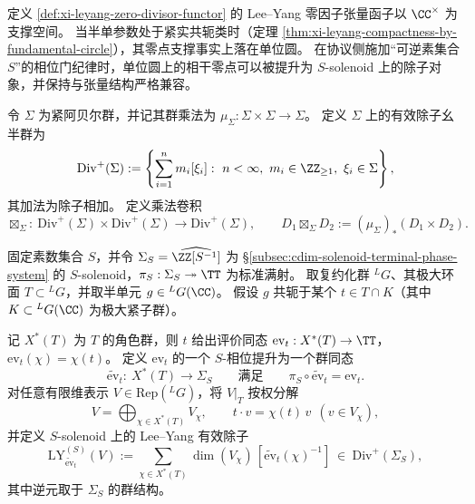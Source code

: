 \noindent
定义 \ref{def:xi-leyang-zero-divisor-functor} 的 Lee--Yang 零因子张量函子以 \(\CC^{\times}\) 为支撑空间。
当半单参数处于紧实共轭类时（定理 \ref{thm:xi-leyang-compactness-by-fundamental-circle}），其零点支撑事实上落在单位圆。
在协议侧施加“可逆素集合 \(S\)”的相位门纪律时，单位圆上的相干零点可以被提升为 \(S\)-solenoid 上的除子对象，并保持与张量结构严格兼容。
\par

\begin{definition}[紧交换群上的有效除子与乘法推前卷积]\label{def:xi-solenoid-divisor-convolution}
令 \(\Sigma\) 为紧阿贝尔群，并记其群乘法为
\(
\mu_{\Sigma}:\Sigma\times\Sigma\to \Sigma
\)。
定义 \(\Sigma\) 上的有效除子幺半群为
\[
\mathrm{Div}^{+}(\Sigma)
:=\left\{\sum_{i=1}^{n}m_i[\xi_i]:\ n<\infty,\ m_i\in\ZZ_{\ge 1},\ \xi_i\in\Sigma\right\},
\]
其加法为除子相加。
定义乘法卷积
\[
\boxtimes_{\Sigma}:\ \mathrm{Div}^{+}(\Sigma)\times \mathrm{Div}^{+}(\Sigma)\to \mathrm{Div}^{+}(\Sigma),
\qquad
D_1\boxtimes_{\Sigma} D_2
:=(\mu_{\Sigma})_{\ast}(D_1\times D_2).
\]
\end{definition}

\begin{definition}\label{def:xi-leyang-solenoidal-divisor}
固定素数集合 \(S\)，并令 \(\Sigma_S=\widehat{\ZZ[S^{-1}]}\) 为 \S\ref{subsec:cdim-solenoid-terminal-phase-system} 的 \(S\)-solenoid，\(\pi_S:\Sigma_S\twoheadrightarrow \TT\) 为标准满射。
取复约化群 \({}^{L}G\)、其极大环面 \(T\subset {}^{L}G\)，并取半单元 \(g\in {}^{L}G(\CC)\)。
假设 \(g\) 共轭于某个 \(t\in T\cap K\)（其中 \(K\subset {}^{L}G(\CC)\) 为极大紧子群）。
\par
记 \(X^{\ast}(T)\) 为 \(T\) 的角色群，则 \(t\) 给出评价同态
\(
\mathrm{ev}_t:X^{\ast}(T)\to \TT
\)，
\(
\mathrm{ev}_t(\chi)=\chi(t)
\)。
定义 \(\mathrm{ev}_t\) 的一个 \(S\)-相位提升为一个群同态
\[
\widetilde{\mathrm{ev}}_t:\ X^{\ast}(T)\longrightarrow \Sigma_S
\qquad\text{满足}\qquad
\pi_S\circ \widetilde{\mathrm{ev}}_t=\mathrm{ev}_t.
\]
对任意有限维表示 \(V\in \mathrm{Rep}({}^{L}G)\)，将 \(V|_{T}\) 按权分解
\[
V=\bigoplus_{\chi\in X^{\ast}(T)} V_{\chi},
\qquad
t\cdot v=\chi(t)\,v\ \ (v\in V_{\chi}),
\]
并定义 \(S\)-solenoid 上的 Lee--Yang 有效除子
\[
\mathrm{LY}^{(S)}_{\widetilde{\mathrm{ev}}_t}(V)
:=
\sum_{\chi\in X^{\ast}(T)} \dim(V_{\chi})\,[\widetilde{\mathrm{ev}}_t(\chi)^{-1}]
\ \in\ \mathrm{Div}^{+}(\Sigma_S),
\]
其中逆元取于 \(\Sigma_S\) 的群结构。
\end{definition}


